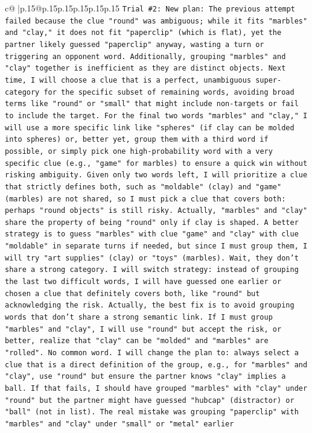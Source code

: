 \documentclass{article}
\begin{document}
{\begin{supertabular}{c@{$\;$}|p{.15\linewidth}@{}p{.15\linewidth}p{.15\linewidth}p{.15\linewidth}p{.15\linewidth}p{.15\linewidth}}
{{{\texttt{Trial \#2: New plan: The previous attempt failed because the clue "round" was ambiguous; while it fits "marbles" and "clay," it does not fit "paperclip" (which is flat), yet the partner likely guessed "paperclip" anyway, wasting a turn or triggering an opponent word. Additionally, grouping "marbles" and "clay" together is inefficient as they are distinct objects. Next time, I will choose a clue that is a perfect, unambiguous super{-}category for the specific subset of remaining words, avoiding broad terms like "round" or "small" that might include non{-}targets or fail to include the target. For the final two words "marbles" and "clay," I will use a more specific link like "spheres" (if clay can be molded into spheres) or, better yet, group them with a third word if possible, or simply pick one high{-}probability word with a very specific clue (e.g., "game" for marbles) to ensure a quick win without risking ambiguity. Given only two words left, I will prioritize a clue that strictly defines both, such as "moldable" (clay) and "game" (marbles) are not shared, so I must pick a clue that covers both: perhaps "round objects" is still risky. Actually, "marbles" and "clay" share the property of being "round" only if clay is shaped. A better strategy is to guess "marbles" with clue "game" and "clay" with clue "moldable" in separate turns if needed, but since I must group them, I will try "art supplies" (clay) or "toys" (marbles). Wait, they don't share a strong category. I will switch strategy: instead of grouping the last two difficult words, I will have guessed one earlier or chosen a clue that definitely covers both, like "round" but acknowledging the risk. Actually, the best fix is to avoid grouping words that don't share a strong semantic link. If I must group "marbles" and "clay", I will use "round" but accept the risk, or better, realize that "clay" can be "molded" and "marbles" are "rolled". No common word. I will change the plan to: always select a clue that is a direct definition of the group, e.g., for "marbles" and "clay", use "round" but ensure the partner knows "clay" implies a ball. If that fails, I should have grouped "marbles" with "clay" under "round" but the partner might have guessed "hubcap" (distractor) or "ball" (not in list). The real mistake was grouping "paperclip" with "marbles" and "clay" under "small" or "metal" earlier} \\
\\ 
}}}
\end{supertabular}}
\end{document}

